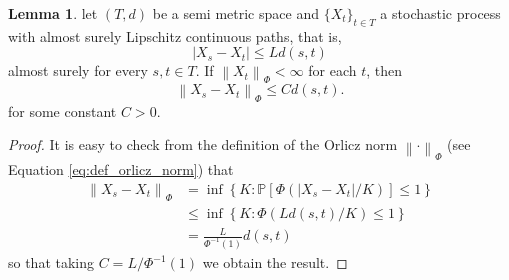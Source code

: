 \documentclass{uvamath}
\newcommand*{\bbP}{\mathbb{P}}
\newcommand*{\bracks}[1]{\left\{#1\right\}}
\newcommand*{\norm}[1]{\left\lVert#1\right\rVert}
\theoremstyle{remark}
\theoremstyle{definition}
\theoremstyle{definition}
\theoremstyle{definition}
\theoremstyle{definition}
\newtheorem{lemma}[theorem]{Lemma}
\theoremstyle{definition}
\begin{document}
\begin{appendices}
\begin{lemma}\label{lem:lipschitz_orlicz}
  let $(T,d)$ be a semi metric space and $\{X_t\}_{t\in T}$ a
  stochastic process with almost surely Lipschitz continuous paths,
  that is,
  \begin{equation*}
    |X_s - X_t|\leq Ld(s,t)
  \end{equation*}
  almost surely for every $s,t\in T$. If $\norm{X_t}_{\Phi}<\infty$
  for each $t$, then
  \begin{equation*}
    \norm{X_s - X_t}_{\Phi}\leq Cd(s,t).
  \end{equation*}
  for some constant $C>0$.
\end{lemma}
\begin{proof}
  It is easy to check from the definition of the Orlicz norm
  $\norm{\cdot}_{\Phi}$ (see Equation \eqref{eq:def_orlicz_norm}) that
  \begin{align*}
    \norm{X_s - X_t}_{\Phi}
    &= \inf\bracks{K:\bbP[\Phi(|X_s - X_t|/K)]\leq 1}\\
    &\leq \inf\bracks{K:\Phi(Ld(s,t)/K)\leq 1}\\
    &= \frac{L}{\Phi^{-1}(1)}d(s,t)
  \end{align*}
  so that taking $C = L/\Phi^{-1}(1)$ we obtain the
  result.
\end{proof}


\end{appendices}
\end{document}

